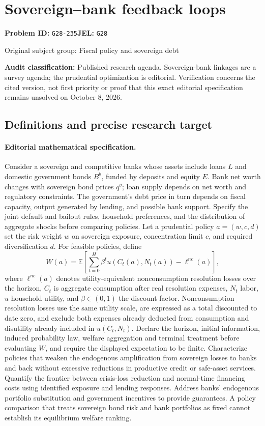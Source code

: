 \documentclass[11pt,a4paper]{article}
\begin{document}
\section*{Sovereign–bank feedback loops}
\textbf{Problem ID:} \texttt{G28-235}\quad \textbf{JEL:} \texttt{G28}\par
\label{problem:OP-0255}
{\sffamily\small\color{muted}Original subject group: Fiscal policy and sovereign debt\par}
\label{definitions:problem:30007536}
\textbf{Audit classification:} Published research agenda. Sovereign-bank linkages are a survey agenda; the prudential optimization is editorial. Verification concerns the cited version, not first priority or proof that this exact editorial specification remains unsolved on October 8, 2026.
\subsection*{Definitions and precise research target}
\paragraph{Editorial mathematical specification.} Consider a sovereign and competitive banks whose assets include loans \(L\) and domestic government bonds \(B^b\), funded by deposits and equity \(E\). Bank net worth changes with sovereign bond prices \(q^g\); loan supply depends on net worth and regulatory constraints. The government’s debt price in turn depends on fiscal capacity, output generated by lending, and possible bank support. Specify the joint default and bailout rules, household preferences, and the distribution of aggregate shocks before comparing policies.
Let a prudential policy \(a=(w,c,d)\) set the risk weight \(w\) on sovereign exposure, concentration limit \(c\), and required diversification \(d\). For feasible policies, define
\[
W(a)=\mathbb{E}\left[\sum_{t=0}^{H}\beta^t u(C_t(a),N_t(a))-\ell^{nc}(a)\right],
\]
where \(\ell^{nc}(a)\) denotes utility-equivalent nonconsumption resolution losses over the horizon, \(C_t\) is aggregate consumption after real resolution expenses, \(N_t\) labor, \(u\) household utility, and \(\beta\in(0,1)\) the discount factor. Nonconsumption resolution losses use the same utility scale, are expressed as a total discounted to date zero, and exclude both expenses already deducted from consumption and disutility already included in \(u(C_t,N_t)\). Declare the horizon, initial information, induced probability law, welfare aggregation and terminal treatment before evaluating \(W\), and require the displayed expectation to be finite. Characterize policies that weaken the endogenous amplification from sovereign losses to banks and back without excessive reductions in productive credit or safe-asset services. Quantify the frontier between crisis-loss reduction and normal-time financing costs using identified exposure and lending responses. Address banks’ endogenous portfolio substitution and government incentives to provide guarantees. A policy comparison that treats sovereign bond risk and bank portfolios as fixed cannot establish its equilibrium welfare ranking.
\end{document}
